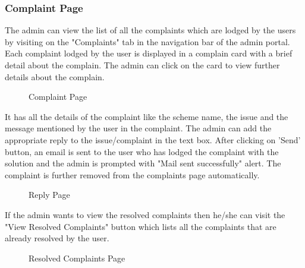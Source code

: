 \documentclass[conference]{IEEEtran}
\begin{document}
\subsubsection{Complaint Page}
The admin can view the list of all the complaints which are lodged by the users by visiting on the "Complaints" tab in the navigation bar of the admin portal. Each complaint lodged by the user is displayed in a complain card with a brief detail about the complain. The admin can click on the card to view further details about the complain.
\begin{figure}[h!]
\centering
{}
\caption{Complaint Page}
\end{figure}
It has all the details of the complaint like the scheme name, the issue and the message mentioned by the user in the complaint. The admin can add the appropriate reply to the issue/complaint in the text box. After clicking on 'Send' button, an email is sent to the user who has lodged the complaint with the solution and the admin is prompted with "Mail sent successfully" alert. The complaint is further removed from the complaints page automatically.
\begin{figure}[h!]
\centering
{}
\caption{Reply Page}
\end{figure}
If the admin wants to view the resolved complaints then he/she can visit the "View Resolved Complaints" button which lists all the complaints that are already resolved by the user.
\begin{figure}[h!]
\centering
{}
\caption{Resolved Complaints Page}
\end{figure}
\end{document}
